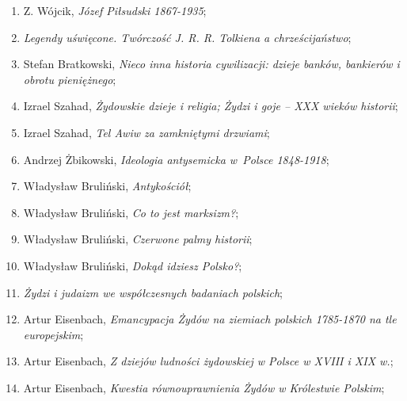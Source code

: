 \documentclass[a4paper,11pt]{article}
\begin{document}
\begin{enumerate}
\item Z. Wójcik, \textit{Józef Piłsudski 1867-1935};



\item \textit{Legendy uświęcone. Twórczość J. R. R. Tolkiena a
    chrześcijaństwo};



\item Stefan Bratkowski, \textit{Nieco inna historia cywilizacji: dzieje
    banków, bankierów i obrotu pieniężnego};



\item Izrael Szahad, \textit{Żydowskie dzieje i religia; Żydzi i goje –
    XXX wieków historii};



\item Izrael Szahad, \textit{Tel Awiw za zamkniętymi drzwiami};



\item Andrzej Żbikowski, \textit{Ideologia antysemicka w~Polsce
    1848-1918};



\item Władysław Bruliński, \textit{Antykościół};



\item Władysław Bruliński, \textit{Co to jest marksizm?};



\item Władysław Bruliński, \textit{Czerwone palmy historii};



\item Władysław Bruliński, \textit{Dokąd idziesz Polsko?};



\item \textit{Żydzi i judaizm we współczesnych badaniach polskich};



\item Artur Eisenbach, \textit{Emancypacja Żydów na ziemiach polskich
    1785-1870 na tle europejskim};



\item Artur Eisenbach, \textit{Z dziejów ludności żydowskiej w Polsce w
    XVIII i XIX w.};



\item Artur Eisenbach, \textit{Kwestia równouprawnienia Żydów w
    Królestwie Polskim};




\end{enumerate}
\end{document}
